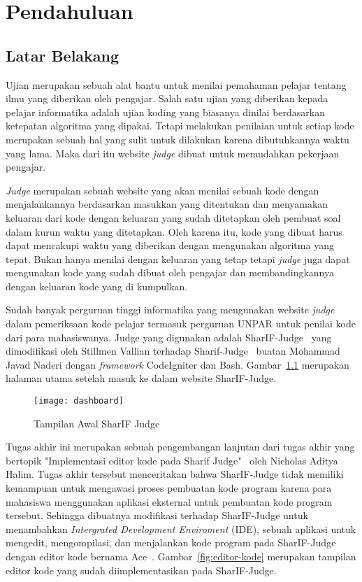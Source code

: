 \chapter{Pendahuluan}
\label{chap:intro}

\section{Latar Belakang}
\label{sec:1:latar_belakang}
Ujian merupakan sebuah alat bantu untuk menilai pemahaman pelajar tentang ilmu yang diberikan oleh pengajar. Salah satu ujian yang diberikan kepada pelajar informatika adalah ujian koding yang biasanya dinilai berdasarkan ketepatan algoritma yang dipakai. Tetapi melakukan penilaian untuk setiap kode merupakan sebuah hal yang sulit untuk dilakukan karena dibutuhkannya waktu yang lama. Maka dari itu website \textit{judge} dibuat untuk memudahkan pekerjaan pengajar. 

\textit{Judge} merupakan sebuah website yang akan menilai sebuah kode dengan menjalankannya berdasarkan masukkan yang ditentukan dan menyamakan keluaran dari kode dengan keluaran yang sudah ditetapkan oleh pembuat soal dalam kurun waktu yang ditetapkan. Oleh karena itu, kode yang dibuat harus dapat mencakupi waktu yang diberikan dengan mengunakan algoritma yang tepat. Bukan hanya menilai dengan keluaran yang tetap tetapi \textit{judge} juga dapat mengunakan kode yang sudah dibuat oleh pengajar dan membandingkannya dengan keluaran kode yang di kumpulkan.

Sudah banyak perguruan tinggi informatika yang mengunakan website \textit{judge} dalam pemeriksaan kode pelajar termasuk perguruan UNPAR untuk penilai kode dari para mahasiswanya. Judge yang digunakan adalah SharIF-Judge~\cite{sharif} yang dimodifikasi oleh Stillmen Vallian terhadap Sharif-Judge~\cite{stillmen:sharif} buatan Mohammad Javad Naderi dengan \textit{framework} CodeIgniter dan Bash. Gambar~\ref{fig:dashboardpng} merupakan halaman utama setelah masuk ke dalam website SharIF-Judge.

\begin{figure}[H]
	\centering  
	\texttt{[image: dashboard]}  
	\caption[Tampilan Awal SharIF Judge]{Tampilan Awal SharIF Judge} 
	\label{fig:dashboardpng} 
\end{figure} 

Tugas akhir ini merupakan sebuah pengembangan lanjutan dari tugas akhir yang bertopik "Implementasi editor kode pada Sharif Judge"~\cite{nicholas:sharif} oleh Nicholas Aditya Halim. Tugas akhir tersebut menceritakan bahwa SharIF-Judge tidak memiliki kemampuan untuk mengawasi proses pembuatan kode program karena para mahasiswa menggunakan aplikasi eksternal untuk pembuatan kode program tersebut. Sehingga dibuatnya modifikasi terhadap SharIF-Judge untuk menambahkan \textit{Intergrated Development Enviroment} (IDE), sebuah aplikasi untuk mengedit, mengompilasi, dan menjalankan kode program pada SharIF-Judge dengan editor kode bernama Ace~\cite{ace}. Gambar~\ref{fig:editor-kode} merupakan tampilan editor kode yang sudah diimplementasikan pada SharIF-Judge.

